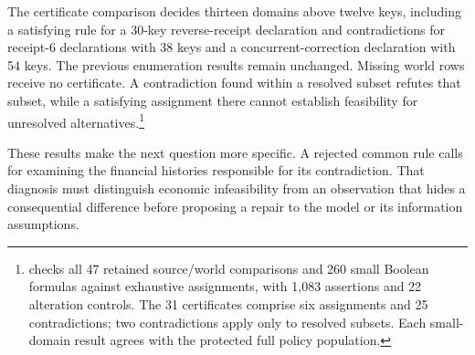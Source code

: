 The certificate comparison decides thirteen domains above twelve keys, including a satisfying rule for a 30-key reverse-receipt declaration and contradictions for receipt-6 declarations with 38 keys and a concurrent-correction declaration with 54 keys. The previous enumeration results remain unchanged. Missing world rows receive no certificate. A contradiction found within a resolved subset refutes that subset, while a satisfying assignment there cannot establish feasibility for unresolved alternatives.\footnote{ checks all 47 retained source/world comparisons and 260 small Boolean formulas against exhaustive assignments, with 1,083 assertions and 22 alteration controls. The 31 certificates comprise six assignments and 25 contradictions; two contradictions apply only to resolved subsets. Each small-domain result agrees with the protected full policy population.}

These results make the next question more specific. A rejected common rule calls for examining the financial histories responsible for its contradiction. That diagnosis must distinguish economic infeasibility from an observation that hides a consequential difference before proposing a repair to the model or its information assumptions.
